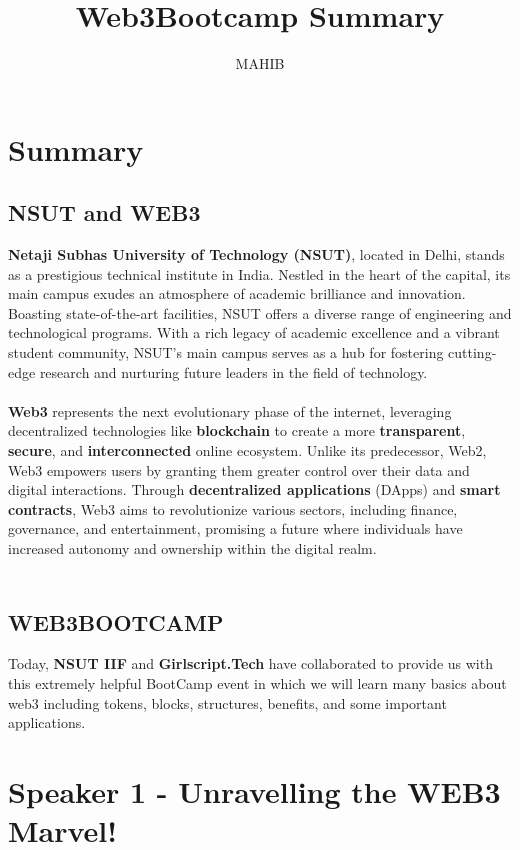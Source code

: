 \documentclass[a4paper,30pt]{report}
\title{\Huge{\textbf{Web3Bootcamp Summary}}}
\author{MAHIB}
\begin{document}
  \maketitle\date{}\newpage
  \tableofcontents\newpage
  
  \chapter{Summary}
      \section{NSUT and WEB3}
        \textbf{Netaji Subhas University of Technology (NSUT)}, located in Delhi, stands as a prestigious technical institute in India. Nestled in the heart of the capital, its main campus exudes an atmosphere of academic brilliance and innovation. Boasting state-of-the-art facilities, NSUT offers a diverse range of engineering and technological programs. With a rich legacy of academic excellence and a vibrant student community, NSUT's main campus serves as a hub for fostering cutting-edge research and nurturing future leaders in the field of technology.\\\\
        \textbf{Web3} represents the next evolutionary phase of the internet, leveraging decentralized technologies like \textbf{blockchain} to create a more \textbf{transparent}, \textbf{secure}, and \textbf{interconnected} online ecosystem. Unlike its predecessor, Web2, Web3 empowers users by granting them greater control over their data and digital interactions. Through \textbf{decentralized applications} (DApps) and \textbf{smart contracts}, Web3 aims to revolutionize various sectors, including finance, governance, and entertainment, promising a future where individuals have increased autonomy and ownership within the digital realm.\\\\
      \section{WEB3BOOTCAMP} 
       Today, \textbf{NSUT IIF} and \textbf{Girlscript.Tech} have collaborated to provide us with this extremely helpful BootCamp event in which we will learn many basics about web3 including tokens, blocks, structures, benefits, and some important applications.\\
    
   \chapter{Speaker 1 - Unravelling the WEB3 Marvel!} 
\end{document}
